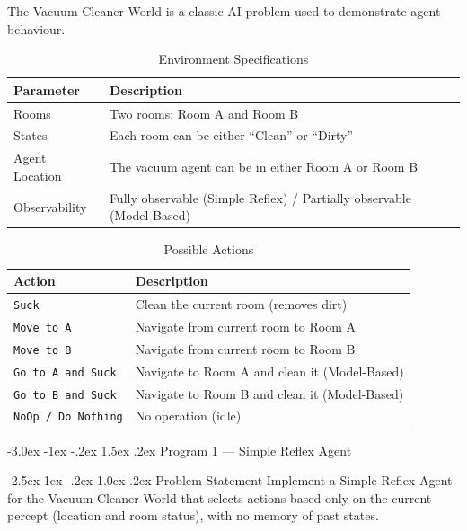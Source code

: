 \documentclass[12pt,a4paper]{article}
\makeatletter
\renewcommand{\section}{\@startsection{section}{1}{\z@}%
  {-3.0ex \@plus -1ex \@minus -.2ex}%
  {1.5ex \@plus.2ex}%
  {\normalfont\Large\bfseries\color{primaryblue}}}
\renewcommand{\subsection}{\@startsection{subsection}{2}{\z@}%
  {-2.5ex\@plus -1ex \@minus -.2ex}%
  {1.0ex \@plus .2ex}%
  {\normalfont\large\bfseries\color{accentblue}}}
\makeatother
\begin{document}
The Vacuum Cleaner World is a classic AI problem used to demonstrate agent behaviour.

\begin{table}[H]
\centering
\caption{Environment Specifications}
\begin{tabularx}{\textwidth}{@{}lX@{}}
\toprule
\textbf{Parameter} & \textbf{Description} \\
\midrule
Rooms & Two rooms: Room A and Room B \\
States & Each room can be either ``Clean'' or ``Dirty'' \\
Agent Location & The vacuum agent can be in either Room A or Room B \\
Observability & Fully observable (Simple Reflex) / Partially observable (Model-Based) \\
\bottomrule
\end{tabularx}
\end{table}

\begin{table}[H]
\centering
\caption{Possible Actions}
\begin{tabularx}{\textwidth}{@{}lX@{}}
\toprule
\textbf{Action} & \textbf{Description} \\
\midrule
\texttt{Suck} & Clean the current room (removes dirt) \\
\texttt{Move to A} & Navigate from current room to Room A \\
\texttt{Move to B} & Navigate from current room to Room B \\
\texttt{Go to A and Suck} & Navigate to Room A and clean it (Model-Based) \\
\texttt{Go to B and Suck} & Navigate to Room B and clean it (Model-Based) \\
\texttt{NoOp / Do Nothing} & No operation (idle) \\
\bottomrule
\end{tabularx}
\end{table}

\newpage
\section{Program 1 --- Simple Reflex Agent}

\subsection{Problem Statement}
Implement a Simple Reflex Agent for the Vacuum Cleaner World that selects actions based only on the current percept (location and room status), with no memory of past states.
\end{document}

